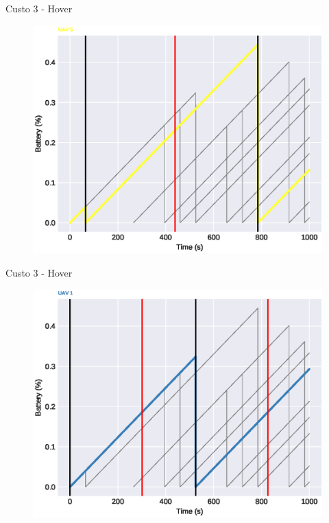 \begin{frame}{Custo 3 - Hover}
                \begin{figure}[!htb]
                     \includegraphics[width=\textwidth]{custo_3/uav_hover_acum_uav_5.eps}
                 \end{figure}
            \end{frame}\begin{frame}{Custo 3 - Hover}
                \begin{figure}[!htb]
                     \includegraphics[width=\textwidth]{custo_3/uav_hover_acum_uav_1.eps}
                 \end{figure}

\end{frame}
